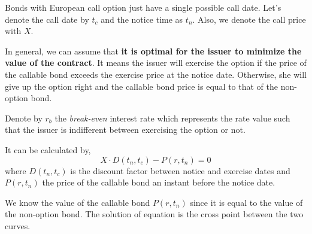 \documentclass[12pt,a4paper]{book}
\begin{document}
\begin{solution}
Bonds with European call option just have a single possible call date. Let's denote the call date by $t_c$ and the notice time as $t_n$. Also, we denote the call price with $X$. 

In general, we can assume that \textbf{it is optimal for the issuer to minimize the value of the contract}. It means the issuer will exercise the option if the price of the callable bond exceeds the exercise price at the notice date. Otherwise, she will give up the option right and the callable bond price is equal to that of the non-option bond.

Denote by $r_b$ the \emph{break-even} interest rate which represents the rate value such that the issuer is indifferent between exercising the option or not.

It can be calculated by,
\begin{equation}
X\cdot D(t_n, t_c) - P(r,t_n)=0
\end{equation}
where $D(t_n, t_c)$ is the discount factor between notice and exercise dates and $P(r,t_n)$ the price of the callable bond an instant before the notice date.

We know the value of the callable bond $P(r,t_n)$ since it is equal to the value of the non-option bond. The solution of equation is the cross point between the two curves.
\end{solution}

\end{document}
